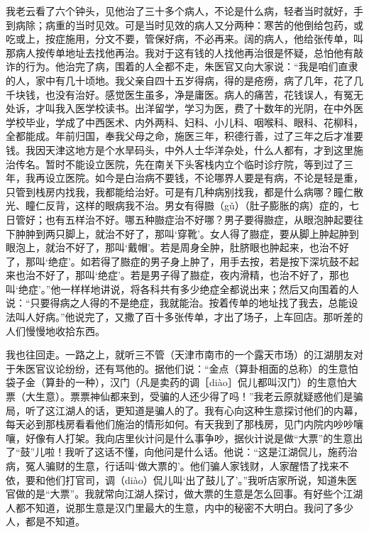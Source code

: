 \documentclass[12pt,UTF8]{ctexbook}
\begin{document}
我老云看了六个钟头，见他治了三十多个病人，不论是什么病，轻者当时就好，手到病除；病重的当时见效。可是当时见效的病人又分两种：寒苦的他倒给包药，或吃或上，按症施用，分文不要，管保好病，不必再来。阔的病人，他给张传单，叫那病人按传单地址去找他再治。我对于这有钱的人找他再治很是怀疑，总怕他有敲诈的行为。他治完了病，围着的人全都不走，朱医官又向大家说：“我是咱们直隶的人，家中有几十顷地。我父亲自四十五岁得病，得的是疮痨，病了几年，花了几千块钱，也没有治好。感觉医生虽多，净是庸医。病人的痛苦，花钱误人，有冤无处诉，才叫我入医学校读书。出洋留学，学习为医，费了十数年的光阴，在中外医学校毕业，学成了中西医术、内外两科、妇科、小儿科、咽喉科、眼科、花柳科，全都能成。年前归国，奉我父母之命，施医三年，积德行善，过了三年之后才准要钱。我因天津这地方是个水旱码头，中外人士华洋杂处，什么人都有，才到这里施治传名。暂时不能设立医院，先在南关下头客栈内立个临时诊疗院，等到过了三年，我再设立医院。如今是白治病不要钱，不论哪界人要是有病，不论是轻是重，只管到栈房内找我，我都能给治好。可是有几种病别找我，都是什么病哪？瞳仁散光、瞳仁反背，这样的眼病我不治。男女有得臌（gǔ）（肚子膨胀的病）症的，七日管好；也有五样治不好。哪五种臌症治不好哪？男子要得臌症，从眼泡肿起要往下肿肿到两只脚上，就治不好了，那叫‘穿靴’。女人得了臌症，要从脚上肿起肿到眼泡上，就治不好了，那叫‘戴帽’。若是周身全肿，肚脐眼也肿起来，也治不好了，那叫‘绝症’。如若得了臌症的男子身上肿了，用手去按，若是按下深坑鼓不起来也治不好了，那叫‘绝症’。若是男子得了臌症，夜内滑精，也治不好了，那也叫‘绝症’。”他一样样地讲说，将各科共有多少绝症全都说出来；然后又向围着的人说：“只要得病之人得的不是绝症，我就能治。按着传单的地址找了我去，总能设法叫人好病。”他说完了，又撒了百十多张传单，才出了场子，上车回店。那听差的人们慢慢地收拾东西。

我也往回走。一路之上，就听三不管（天津市南市的一个露天市场）的江湖朋友对于朱医官议论纷纷，还有骂他的。据他们说：“金点（算卦相面的总称）的生意怕袋子金（算卦的一种），汉门（凡是卖药的调［diào］侃儿都叫汉门）的生意怕大票（大生意）。票票神仙都来到，受骗的人还少得了吗！”我老云原就疑惑他们是骗局，听了这江湖人的话，更知道是骗人的了。我有心向这种生意探讨他们的内幕，每天必到那栈房看看他们施治的情形如何。有天我到了那栈房，见门内院内吵吵嚷嚷，好像有人打架。我向店里伙计问是什么事争吵，据伙计说是做“大票”的生意出了“鼓”儿啦！我听了这话不懂，向他问是什么话。他说：“这是江湖侃儿，施药治病，冤人骗财的生意，行话叫‘做大票的’。他们骗人家钱财，人家醒悟了找来不依，要和他们打官司，调（diào）侃儿叫‘出了鼓儿了’。”我听店家所说，知道朱医官做的是“大票”。我就常向江湖人探讨，做大票的生意是怎么回事。有好些个江湖人都不知道，说那生意是汉门里最大的生意，内中的秘密不大明白。我问了多少人，都是不知道。
\end{document}
